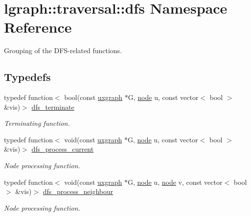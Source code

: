 \hypertarget{namespacelgraph_1_1traversal_1_1dfs}{}\section{lgraph\+:\+:traversal\+:\+:dfs Namespace Reference}
\label{namespacelgraph_1_1traversal_1_1dfs}


Grouping of the D\+F\+S-\/related functions.  


\subsection*{Typedefs}
\begin{DoxyCompactItemize}
\item 
typedef function$<$ bool(const \hyperlink{classlgraph_1_1utils_1_1uxgraph}{uxgraph} $\ast$G, \hyperlink{namespacelgraph_1_1utils_ab9c6b34241f0b68372c55f34c460e863}{node} u, const vector$<$ bool $>$ \&vis)$>$ \hyperlink{namespacelgraph_1_1traversal_1_1dfs_a41b39b9a31fd3665c970a6eb70564765}{dfs\+\_\+terminate}
\begin{DoxyCompactList}\small\item\em Terminating function. \end{DoxyCompactList}\item 
typedef function$<$ void(const \hyperlink{classlgraph_1_1utils_1_1uxgraph}{uxgraph} $\ast$G, \hyperlink{namespacelgraph_1_1utils_ab9c6b34241f0b68372c55f34c460e863}{node} u, const vector$<$ bool $>$ \&vis)$>$ \hyperlink{namespacelgraph_1_1traversal_1_1dfs_a918161e9face694d4ebdc4ba13cdd5ac}{dfs\+\_\+process\+\_\+current}
\begin{DoxyCompactList}\small\item\em Node processing function. \end{DoxyCompactList}\item 
typedef function$<$ void(const \hyperlink{classlgraph_1_1utils_1_1uxgraph}{uxgraph} $\ast$G, \hyperlink{namespacelgraph_1_1utils_ab9c6b34241f0b68372c55f34c460e863}{node} u, \hyperlink{namespacelgraph_1_1utils_ab9c6b34241f0b68372c55f34c460e863}{node} v, const vector$<$ bool $>$ \&vis)$>$ \hyperlink{namespacelgraph_1_1traversal_1_1dfs_af04d72933b75432a505b1235d173da4b}{dfs\+\_\+process\+\_\+neighbour}
\begin{DoxyCompactList}\small\item\em Node processing function. \end{DoxyCompactList}\end{DoxyCompactItemize}

